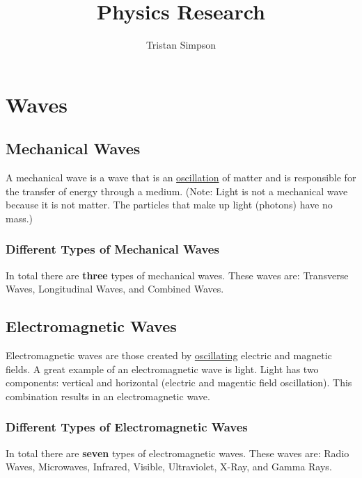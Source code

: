 \documentclass{article}
\title{Physics Research}
\author{Tristan Simpson}
\begin{document}
\maketitle
\tableofcontents
\section{Waves}
\subsection{Mechanical Waves}
A mechanical wave is a wave that is an \hyperref[sec:oscillation]{oscillation} of matter and is responsible for the transfer of energy through a medium. (Note: Light is not a mechanical wave because it is not matter. The particles that make up light (photons) have no mass.)

\subsubsection{Different Types of Mechanical Waves}
In total there are \textbf{three} types of mechanical waves. These waves are: Transverse Waves, Longitudinal Waves, and Combined Waves.

\subsection{Electromagnetic Waves}
Electromagnetic waves are those created by \hyperref[sec:oscillation]{oscillating} electric and magnetic fields. A great example of an electromagnetic wave is light. Light has two components: vertical and horizontal (electric and magentic field oscillation). This combination results in an electromagnetic wave.

\subsubsection{Different Types of Electromagnetic Waves}
In total there are \textbf{seven} types of electromagnetic waves. These waves are: Radio Waves, Microwaves, Infrared, Visible, Ultraviolet, X-Ray, and Gamma Rays.
\end{document}
